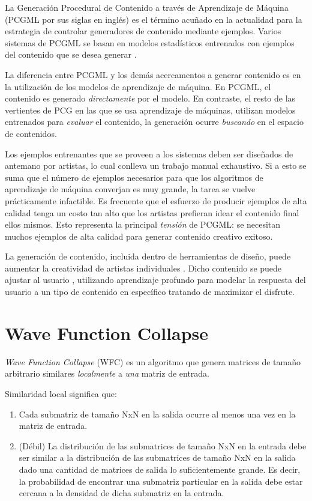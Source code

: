 La Generación Procedural de Contenido a través de Aprendizaje de Máquina (PCGML por sus siglas en inglés)
es el término acuñado en la actualidad para la estrategia de controlar
generadores de contenido mediante ejemplos. Varios sistemas
de PCGML se basan en modelos estadísticos entrenados con ejemplos
del contenido que se desea generar \cite{bib:1}. 

La diferencia entre PCGML y los demás acercamentos a 
generar contenido es en la utilización de los modelos
de aprendizaje de máquina.
En PCGML, el contenido es generado \textit{directamente} por el modelo.
En contraste, el resto de las vertientes de PCG en las que se usa
aprendizaje de máquinas, utilizan modelos
entrenados para \textit{evaluar} el contenido, la generación
ocurre \textit{buscando} en el espacio de contenidos.

Los ejemplos entrenantes que se proveen
a los sistemas deben ser diseñados de antemano por artistas, lo cual
conlleva un trabajo manual exhaustivo. Si a esto se suma que el número
de ejemplos necesarios para que los algoritmos de aprendizaje de máquina
converjan es muy grande, la tarea se vuelve prácticamente infactible.
Es frecuente que el esfuerzo de producir ejemplos de alta calidad
tenga un costo tan alto que los artistas prefieran idear
el contenido final ellos mismos. Esto representa la principal
\textit{tensión} de PCGML: se necesitan muchos ejemplos de alta calidad
para generar contenido creativo exitoso.

La generación de contenido, incluida dentro de herramientas de diseño,
puede aumentar la creatividad de artistas individuales \cite{bib:4}.
Dicho contenido se puede ajustar al usuario
\cite{bib:7}, utilizando aprendizaje profundo para modelar la respuesta
del usuario a un tipo de contenido en específico tratando de maximizar
el disfrute.

\section*{Wave Function Collapse}

\textit{Wave Function Collapse} (WFC) \cite{bib:2} 
es un algoritmo que genera matrices de tamaño arbitrario
similares \textit{localmente} a \textit{una} matriz de entrada.

Similaridad local significa que: 
\begin{enumerate}
    \item Cada submatriz de tamaño NxN en la salida ocurre al menos una vez
        en la matriz de entrada.
    \item (Débil) La distribución de las submatrices de tamaño NxN en la entrada debe ser
        similar a la distribución de las submatrices de tamaño NxN en la salida dado
        una cantidad de matrices de salida lo suficientemente grande. Es decir, la probabilidad
        de encontrar una submatriz particular en la salida debe estar cercana a la densidad
        de dicha submatriz en la entrada. 
\end{enumerate}


